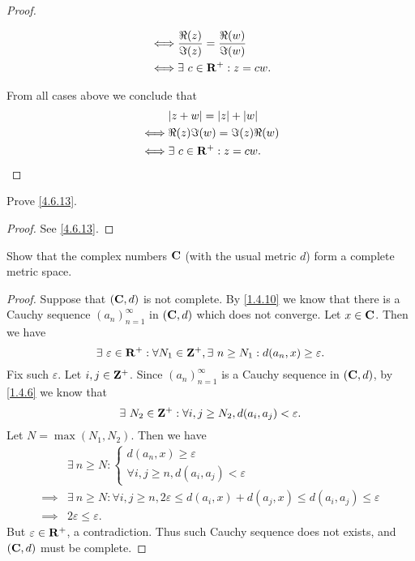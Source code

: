 \begin{proof}
\begin{itemize}
\begin{align*}
            \iff & \frac{\Re(z)}{\Im(z)} = \frac{\Re(w)}{\Im(w)} \\
            \iff & \exists\ c \in \mathbf{R}^+ : z = cw.
          \end{align*}
  \end{itemize}
  From all cases above we conclude that
  \begin{align*}
         & \abs{z + w} = \abs{z} + \abs{w} \\
    \iff & \Re(z) \Im(w) = \Im(z) \Re(w)   \\
    \iff & \exists\ c \in \R^+ : z = cw.
  \end{align*}
\end{proof}

\begin{exercise}\label{ex 4.6.9}
  Prove \cref{4.6.13}.
\end{exercise}

\begin{proof}
  See \cref{4.6.13}.
\end{proof}

\begin{exercise}\label{ex 4.6.10}
  Show that the complex numbers \(\mathbf{C}\) (with the usual metric \(d\)) form a complete metric space.
\end{exercise}

\begin{proof}
  Suppose that \((\mathbf{C}, d)\) is not complete.
  By \cref{1.4.10} we know that there is a Cauchy sequence \((a_n)_{n = 1}^\infty\) in \((\mathbf{C}, d)\) which does not converge.
  Let \(x \in \mathbf{C}\).
  Then we have
  \[
    \exists\ \varepsilon \in \mathbf{R}^+ : \forall N_1 \in \mathbf{Z}^+, \exists\ n \geq N_1 : d(a_n, x) \geq \varepsilon.
  \]
  Fix such \(\varepsilon\).
  Let \(i, j \in \mathbf{Z}^+\).
  Since \((a_n)_{n = 1}^\infty\) is a Cauchy sequence in \((\mathbf{C}, d)\), by \cref{1.4.6} we know that
  \[
    \exists\ N_2 \in \mathbf{Z}^+ : \forall i, j \geq N_2, d(a_i, a_j) < \varepsilon.
  \]
  Let \(N = \max(N_1, N_2)\).
  Then we have
  \begin{align*}
             & \exists\ n \geq N : \begin{cases}
                                     d(a_n, x) \geq \varepsilon \\
                                     \forall i, j \geq n, d(a_i, a_j) < \varepsilon
                                   \end{cases}                                                  \\
    \implies & \exists\ n \geq N : \forall i, j \geq n, 2\varepsilon \leq d(a_i, x) + d(a_j, x) \leq d(a_i, a_j) \leq \varepsilon \\
    \implies & 2\varepsilon \leq \varepsilon.
  \end{align*}
  But \(\varepsilon \in \mathbf{R}^+\), a contradiction.
  Thus such Cauchy sequence does not exists, and \((\mathbf{C}, d)\) must be complete.
\end{proof}

